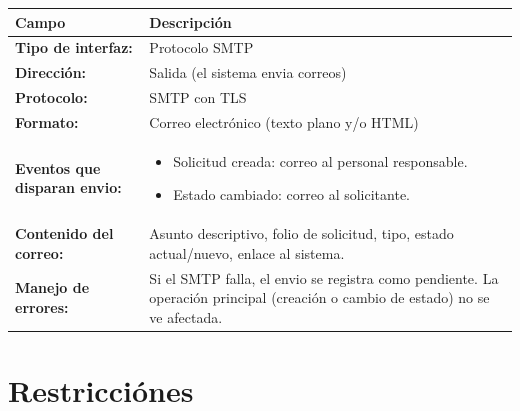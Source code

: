 \begin{table}[H]
\centering
\begin{tabular}{|L{3.5cm}|L{10cm}|}
    \hline
    \textbf{Campo} & \textbf{Descripción} \\
    \hline
    \textbf{Tipo de interfaz:} & Protocolo SMTP \\
    \hline
    \textbf{Dirección:} & Salida (el sistema envia correos) \\
    \hline
    \textbf{Protocolo:} & SMTP con TLS \\
    \hline
    \textbf{Formato:} & Correo electrónico (texto plano y/o HTML) \\
    \hline
    \textbf{Eventos que disparan envio:} &
    \begin{itemize}[nosep, leftmargin=*]
        \item Solicitud creada: correo al personal responsable.
        \item Estado cambiado: correo al solicitante.
    \end{itemize} \\
    \hline
    \textbf{Contenido del correo:} & Asunto descriptivo, folio de solicitud, tipo, estado actual/nuevo, enlace al sistema. \\
    \hline
    \textbf{Manejo de errores:} & Si el SMTP falla, el envio se registra como pendiente. La operación principal (creación o cambio de estado) no se ve afectada. \\
    \hline
\end{tabular}
\end{table}

\section{Restricciónes}

